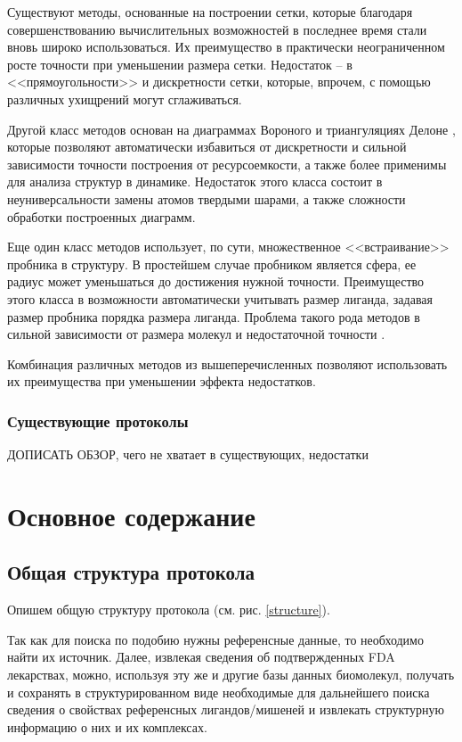 \documentclass[a4paper,14pt]{article}         %
\begin{document}
Существуют методы, основанные на построении сетки, которые благодаря совершенствованию вычислительных возможностей в последнее время стали вновь широко использоваться. Их преимущество в практически неограниченном росте точности при уменьшении размера сетки. Недостаток -- в <<прямоугольности>> и дискретности сетки, которые, впрочем, с помощью различных ухищрений могут сглаживаться.

Другой класс методов основан на диаграммах Вороного и триангуляциях Делоне \cite{Aurenhammer1991}, которые позволяют автоматически избавиться от дискретности и сильной зависимости точности построения от ресурсоемкости, а также более применимы для анализа структур в динамике. Недостаток этого класса состоит в неуниверсальности замены атомов твердыми шарами, а также сложности обработки построенных диаграмм.

Еще один класс методов использует, по сути, множественное <<встраивание>> пробника в структуру. В простейшем случае пробником является сфера, ее радиус может уменьшаться до достижения нужной точности. Преимущество этого класса в возможности автоматически учитывать размер лиганда, задавая размер пробника порядка размера лиганда. Проблема такого рода методов в сильной зависимости от размера молекул и недостаточной точности \cite{Krone2016}.

Комбинация различных методов из вышеперечисленных позволяют использовать их преимущества при уменьшении эффекта недостатков.
\subsubsection{Существующие протоколы}
\color{orange} ДОПИСАТЬ ОБЗОР, чего не хватает в существующих, недостатки\cite{Chartier2017}
\color{black}


\newpage
\section{Основное содержание}
\subsection{Общая структура протокола}
Опишем общую структуру протокола (см. рис. \ref{structure}).

Так как для поиска по подобию нужны референсные данные, то необходимо найти их источник. Далее, извлекая сведения об подтвержденных FDA лекарствах, можно, используя эту же и другие базы данных биомолекул, получать и сохранять в структурированном виде необходимые для дальнейшего поиска сведения о свойствах референсных лигандов/мишеней и извлекать структурную информацию о них и их комплексах.
\end{document}

